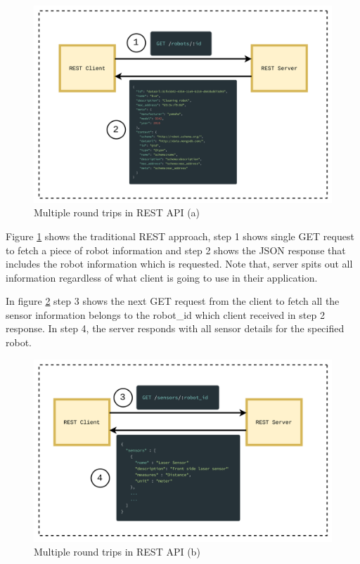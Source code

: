 	\begin{figure}[!htbp] 
		\begin{center}
			\includegraphics[trim={0 0 0 2cm},clip,scale=0.09]{./images/png/rest_roundtrip_1}	
			\caption{Multiple round trips in REST API (a)}	
			\label{fig:rest_roundtrip_1}	
		\end{center}
	\end{figure}
	
   Figure \ref{fig:rest_roundtrip_1} shows the traditional REST approach, step 1 shows single GET request to fetch a piece of robot information and step 2 shows the JSON response that includes the robot information which is requested. Note that, server spits out all information regardless of what client is going to use in their application. 
   
   In figure \ref{fig:rest_roundtrip_2} step 3 shows the next GET request from the client to fetch all the sensor information belongs to the robot\_id which client received in step 2 response. In step 4, the server responds with all sensor details for the specified robot. 
	
	\begin{figure}[!htbp] 
		\begin{center}
			\includegraphics[trim={0 0 0 2cm},clip,scale=0.09]{./images/png/rest_roundtrip_2}	
			\caption{Multiple round trips in REST API (b)}	
			\label{fig:rest_roundtrip_2}	
		\end{center}
	\end{figure}

